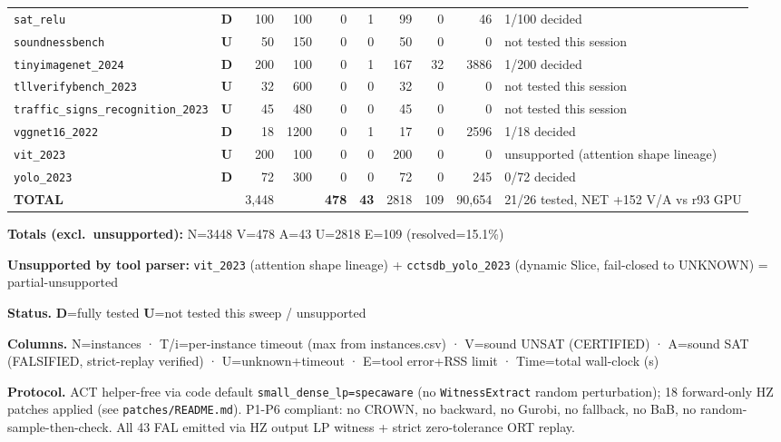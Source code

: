 \documentclass[10pt]{beamer}
\newcommand{\sdone}{{\color{cdone}\textbf{D}}}
\newcommand{\sunsup}{{\color{cunsup}\textbf{U}}}
\begin{document}
\begin{frame}[fragile]
\begin{tabular}{l c r r r r r r r l}
  \texttt{sat\_relu} & \sdone & 100 & 100 & 0 & 1 & 99 & 0 & 46 & 1/100 decided \\
  \texttt{soundnessbench} & \sunsup & 50 & 150 & 0 & 0 & 50 & 0 & 0 & not tested this session \\
  \texttt{tinyimagenet\_2024} & \sdone & 200 & 100 & 0 & 1 & 167 & 32 & 3886 & 1/200 decided \\
  \texttt{tllverifybench\_2023} & \sunsup & 32 & 600 & 0 & 0 & 32 & 0 & 0 & not tested this session \\
  \texttt{traffic\_signs\_recognition\_2023} & \sunsup & 45 & 480 & 0 & 0 & 45 & 0 & 0 & not tested this session \\
  \texttt{vggnet16\_2022} & \sdone & 18 & 1200 & 0 & 1 & 17 & 0 & 2596 & 1/18 decided \\
  \texttt{vit\_2023} & \sunsup & 200 & 100 & 0 & 0 & 200 & 0 & 0 & unsupported (attention shape lineage) \\
  \texttt{yolo\_2023} & \sdone & 72 & 300 & 0 & 0 & 72 & 0 & 245 & 0/72 decided \\
\midrule
\textbf{TOTAL} & & 3,448 & & \textbf{478} & \textbf{43} & 2818 & 109 & 90,654 & 21/26 tested, NET +152 V/A vs r93 GPU \\
\bottomrule
\end{tabular}

\vspace{0.4em}
\centering\scriptsize
\textbf{Totals (excl.\ unsupported):} N=3448 V=478 A=43 U=2818 E=109 (resolved=15.1\%)

\textbf{Unsupported by tool parser:} \texttt{vit\_2023} (attention shape lineage) +
\texttt{cctsdb\_yolo\_2023} (dynamic Slice, fail-closed to UNKNOWN) = partial-unsupported

\vspace{0.3em}
\centering\scriptsize
\textbf{Status.} \sdone=fully tested \sunsup=not tested this sweep / unsupported

\textbf{Columns.} N=instances · T/i=per-instance timeout (max from instances.csv) · V=sound UNSAT (CERTIFIED) · A=sound SAT (FALSIFIED, strict-replay verified) · U=unknown+timeout · E=tool error+RSS limit · Time=total wall-clock (s)

\textbf{Protocol.} ACT helper-free via code default \texttt{small\_dense\_lp=specaware} (no \texttt{WitnessExtract} random perturbation); 18 forward-only HZ patches applied (see \texttt{patches/README.md}). P1-P6 compliant: no CROWN, no backward, no Gurobi, no fallback, no BaB, no random-sample-then-check. All 43 FAL emitted via HZ output LP witness + strict zero-tolerance ORT replay.
\end{frame}
\end{document}

